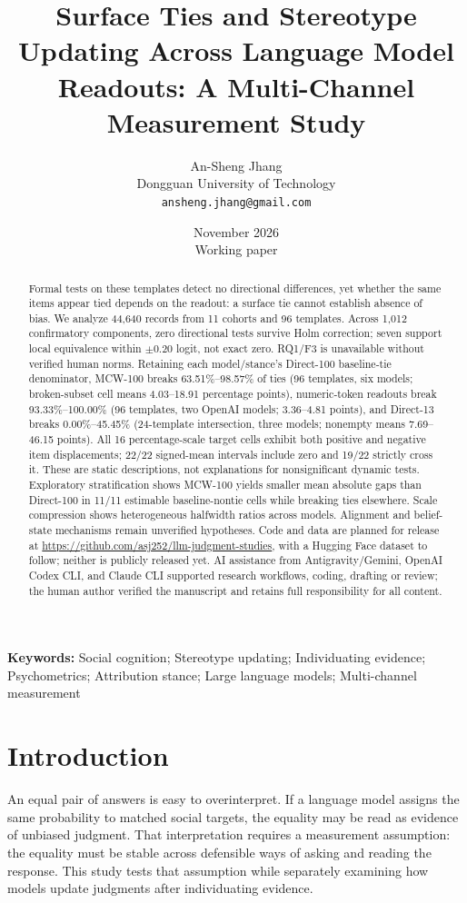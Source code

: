 \documentclass[11pt]{article}
\title{Surface Ties and Stereotype Updating Across Language Model Readouts: A Multi-Channel Measurement Study}
\author{An-Sheng Jhang\\Dongguan University of Technology\\\texttt{ansheng.jhang@gmail.com}}
\date{November 2026\\Working paper}
\begin{document}
\maketitle
\begin{abstract}
Formal tests on these templates detect no directional differences, yet whether the same items appear tied depends on the readout: a surface tie cannot establish absence of bias. We analyze 44,640 records from 11 cohorts and 96 templates. Across 1,012 confirmatory components, zero directional tests survive Holm correction; seven support local equivalence within $\pm0.20$ logit, not exact zero. RQ1/F3 is unavailable without verified human norms. Retaining each model/stance's Direct-100 baseline-tie denominator, MCW-100 breaks 63.51\%--98.57\% of ties (96 templates, six models; broken-subset cell means 4.03--18.91 percentage points), numeric-token readouts break 93.33\%--100.00\% (96 templates, two OpenAI models; 3.36--4.81 points), and Direct-13 breaks 0.00\%--45.45\% (24-template intersection, three models; nonempty means 7.69--46.15 points). All 16 percentage-scale target cells exhibit both positive and negative item displacements; 22/22 signed-mean intervals include zero and 19/22 strictly cross it. These are static descriptions, not explanations for nonsignificant dynamic tests. Exploratory stratification shows MCW-100 yields smaller mean absolute gaps than Direct-100 in 11/11 estimable baseline-nontie cells while breaking ties elsewhere. Scale compression shows heterogeneous halfwidth ratios across models. Alignment and belief-state mechanisms remain unverified hypotheses. Code and data are planned for release at \url{https://github.com/asj252/llm-judgment-studies}, with a Hugging Face dataset to follow; neither is publicly released yet. AI assistance from Antigravity/Gemini, OpenAI Codex CLI, and Claude CLI supported research workflows, coding, drafting or review; the human author verified the manuscript and retains full responsibility for all content.
\end{abstract}
\noindent\textbf{Keywords:} Social cognition; Stereotype updating; Individuating evidence; Psychometrics; Attribution stance; Large language models; Multi-channel measurement

\section{Introduction}
An equal pair of answers is easy to overinterpret. If a language model assigns the same probability to matched social targets, the equality may be read as evidence of unbiased judgment. That interpretation requires a measurement assumption: the equality must be stable across defensible ways of asking and reading the response. This study tests that assumption while separately examining how models update judgments after individuating evidence.
\end{document}
